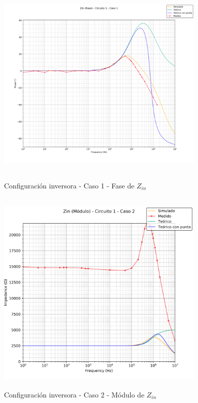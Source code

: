 \begin{figure}[H] %
	\centering
	\includegraphics[width=10cm,height=10cm,keepaspectratio]{../EJ1/00GRAFICOS/c1c1/c1c1zinFASE.png}
	\caption{Configuración inversora - Caso 1 - Fase de $Z_{in}$ }
	\label{c1c1zinP}
\end{figure}

\begin{figure}[H] %
	\centering
	\includegraphics[width=10cm,height=10cm,keepaspectratio]{../EJ1/00GRAFICOS/c1c2/c1c2ZINpunta.png}
	\caption{Configuración inversora - Caso 2 - M\'odulo de $Z_{in}$}
	\label{c1c2zinM}
\end{figure}

